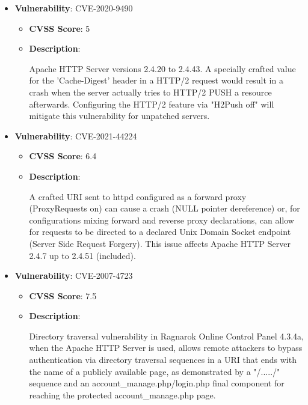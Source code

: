 \documentclass{article}
\begin{document}
\begin{itemize}
        \item \textbf{Vulnerability}: CVE-2020-9490
        \begin{itemize}
            \item \textbf{CVSS Score}:  5 
            \item \textbf{Description}:
            \parbox[t]{0.9\linewidth}{
                \ttfamily Apache HTTP Server versions 2.4.20 to 2.4.43. A specially crafted value for the 'Cache-Digest' header in a HTTP/2 request would result in a crash when the server actually tries to HTTP/2 PUSH a resource afterwards. Configuring the HTTP/2 feature via "H2Push off" will mitigate this vulnerability for unpatched servers.
            }
        \end{itemize}
    
        \item \textbf{Vulnerability}: CVE-2021-44224
        \begin{itemize}
            \item \textbf{CVSS Score}:  6.4 
            \item \textbf{Description}:
            \parbox[t]{0.9\linewidth}{
                \ttfamily A crafted URI sent to httpd configured as a forward proxy (ProxyRequests on) can cause a crash (NULL pointer dereference) or, for configurations mixing forward and reverse proxy declarations, can allow for requests to be directed to a declared Unix Domain Socket endpoint (Server Side Request Forgery). This issue affects Apache HTTP Server 2.4.7 up to 2.4.51 (included).
            }
        \end{itemize}
    
        \item \textbf{Vulnerability}: CVE-2007-4723
        \begin{itemize}
            \item \textbf{CVSS Score}:  7.5 
            \item \textbf{Description}:
            \parbox[t]{0.9\linewidth}{
                \ttfamily Directory traversal vulnerability in Ragnarok Online Control Panel 4.3.4a, when the Apache HTTP Server is used, allows remote attackers to bypass authentication via directory traversal sequences in a URI that ends with the name of a publicly available page, as demonstrated by a "/...../" sequence and an account\_manage.php/login.php final component for reaching the protected account\_manage.php page.
            }
        \end{itemize}
    

\end{itemize}
\end{document}
